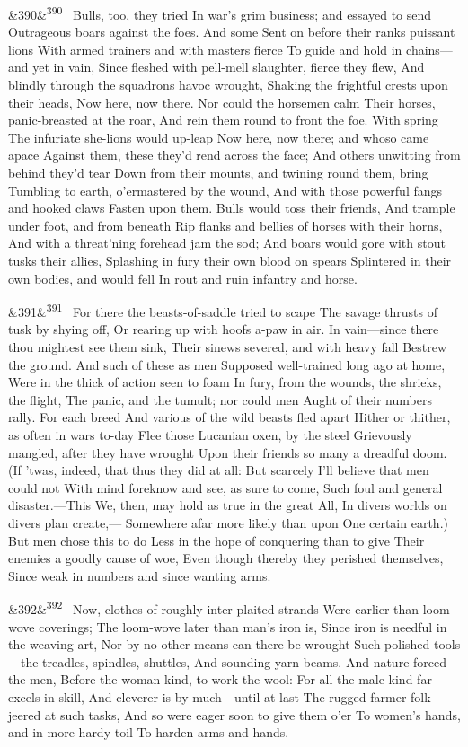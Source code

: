 \documentclass[12pt]{article}
\newcommand{\para}[1][]{\par\noindent\ifx&#1&\else\textsuperscript{\footnotesize #1}~\fi}
\begin{document}
\para[390] Bulls, too, they tried In war's grim business; and essayed to send Outrageous boars against the foes. And some Sent on before their ranks puissant lions With armed trainers and with masters fierce To guide and hold in chains---and yet in vain, Since fleshed with pell-mell slaughter, fierce they flew, And blindly through the squadrons havoc wrought, Shaking the frightful crests upon their heads, Now here, now there. Nor could the horsemen calm Their horses, panic-breasted at the roar, And rein them round to front the foe. With spring The infuriate she-lions would up-leap Now here, now there; and whoso came apace Against them, these they'd rend across the face; And others unwitting from behind they'd tear Down from their mounts, and twining round them, bring Tumbling to earth, o'ermastered by the wound, And with those powerful fangs and hooked claws Fasten upon them. Bulls would toss their friends, And trample under foot, and from beneath Rip flanks and bellies of horses with their horns, And with a threat'ning forehead jam the sod; And boars would gore with stout tusks their allies, Splashing in fury their own blood on spears Splintered in their own bodies, and would fell In rout and ruin infantry and horse.

\para[391] For there the beasts-of-saddle tried to scape The savage thrusts of tusk by shying off, Or rearing up with hoofs a-paw in air. In vain---since there thou mightest see them sink, Their sinews severed, and with heavy fall Bestrew the ground. And such of these as men Supposed well-trained long ago at home, Were in the thick of action seen to foam In fury, from the wounds, the shrieks, the flight, The panic, and the tumult; nor could men Aught of their numbers rally. For each breed And various of the wild beasts fled apart Hither or thither, as often in wars to-day Flee those Lucanian oxen, by the steel Grievously mangled, after they have wrought Upon their friends so many a dreadful doom. (If 'twas, indeed, that thus they did at all: But scarcely I'll believe that men could not With mind foreknow and see, as sure to come, Such foul and general disaster.---This We, then, may hold as true in the great All, In divers worlds on divers plan create,--- Somewhere afar more likely than upon One certain earth.) But men chose this to do Less in the hope of conquering than to give Their enemies a goodly cause of woe, Even though thereby they perished themselves, Since weak in numbers and since wanting arms.

\para[392] Now, clothes of roughly inter-plaited strands Were earlier than loom-wove coverings; The loom-wove later than man's iron is, Since iron is needful in the weaving art, Nor by no other means can there be wrought Such polished tools---the treadles, spindles, shuttles, And sounding yarn-beams. And nature forced the men, Before the woman kind, to work the wool: For all the male kind far excels in skill, And cleverer is by much---until at last The rugged farmer folk jeered at such tasks, And so were eager soon to give them o'er To women's hands, and in more hardy toil To harden arms and hands.
\end{document}
